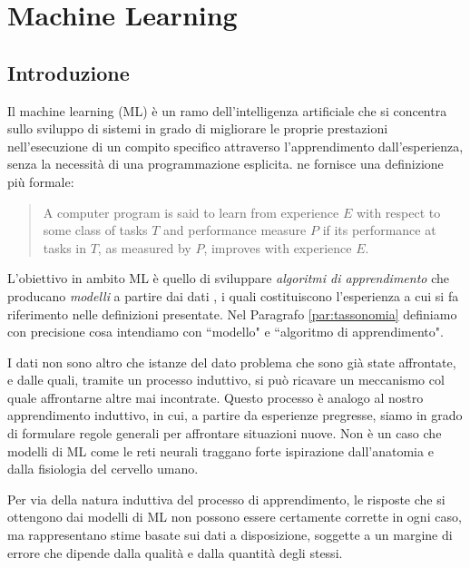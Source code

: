 \chapter{Machine Learning}

\section{Introduzione}

Il machine learning (ML) è un ramo dell'intelligenza artificiale che si concentra sullo sviluppo di sistemi in grado di migliorare le proprie prestazioni nell'esecuzione di un compito specifico attraverso l'apprendimento dall'esperienza, senza la necessità di una programmazione esplicita.
\textcite{mitchell1997ml} ne fornisce una definizione più formale:

\blockquote{A computer program is said to learn from experience $E$ with respect to some class of tasks $T$ and performance measure $P$ if its performance at tasks in $T$, as measured by $P$, improves with experience $E$.}

L'obiettivo in ambito ML è quello di sviluppare \textit{algoritmi di apprendimento} che producano \textit{modelli} a partire dai dati \parencite{zhou2021ml}, i quali costituiscono l'esperienza a cui si fa riferimento nelle definizioni presentate. Nel Paragrafo \ref{par:tassonomia} definiamo con precisione cosa intendiamo con ``modello" e ``algoritmo di apprendimento".

I dati non sono altro che istanze del dato problema che sono già state affrontate, e dalle quali, tramite un processo induttivo, si può ricavare un meccanismo col quale affrontarne altre mai incontrate. Questo processo è analogo al nostro apprendimento induttivo, in cui, a partire da esperienze pregresse, siamo in grado di formulare regole generali per affrontare situazioni nuove.
Non è un caso che modelli di ML come le reti neurali traggano forte ispirazione dall'anatomia e dalla fisiologia del cervello umano.

Per via della natura induttiva del processo di apprendimento, le risposte che si ottengono dai modelli di ML non possono essere certamente corrette in ogni caso, ma rappresentano stime basate sui dati a disposizione, soggette a un margine di errore che dipende dalla qualità e dalla quantità degli stessi.

